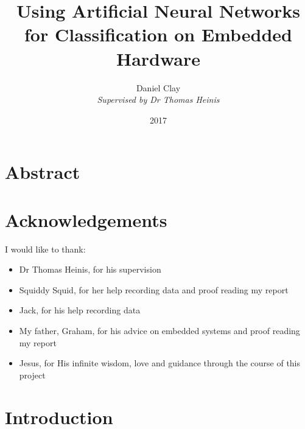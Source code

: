 \documentclass[a4paper]{article}
\begin{document}
\title{Using Artificial Neural Networks for Classification on Embedded Hardware}
\date{2017}
\author{
Daniel Clay\\
\emph{Supervised by Dr Thomas Heinis}\\ 
}
\maketitle
\pagebreak

\section{Abstract}
\label{sec:ab}


\section{Acknowledgements}
\label{sec:ak}

I would like to thank:

\begin{itemize}
\item Dr Thomas Heinis, for his supervision
\item Squiddy Squid, for her help recording data and proof reading my report
\item Jack, for his help recording data
\item My father, Graham, for his advice on embedded systems and proof reading my report
\item Jesus, for His infinite wisdom, love and guidance through the course of this project
\end{itemize}


\pagebreak
\tableofcontents
\pagebreak


\newpage
\section{Introduction}
\label{sec:in}
\end{document}
